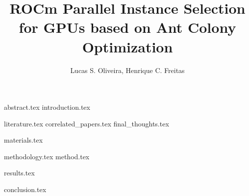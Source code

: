 \documentclass{article}
\title{ROCm Parallel Instance Selection for GPUs based on Ant Colony Optimization}
\author{{Lucas S. Oliveira\inst{1}, Henrique C. Freitas\inst{1}}}
\begin{document}
\maketitle

{abstract.tex}
{introduction.tex}

{literature.tex}
{correlated_papers.tex}
{final_thoughts.tex}

{materials.tex}

{methodology.tex}
{method.tex}

{results.tex}

{conclusion.tex}

\printbibliography
\end{document}
